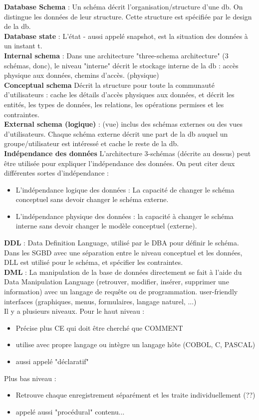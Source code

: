 \textbf{Database Schema} : 
Un schéma décrit l'organisation/structure d'une db. On distingue les données 
de leur structure. Cette structure est spécifiée par le design de la db.\\
\textbf{Database state} : L'état - aussi appelé snapshot, est la situation 
des données à un instant t. \\
\textbf{Internal schema} : 
Dans une architecture "three-schema architecture" (3 schémas, donc), 
le niveau "interne" décrit le stockage interne de la db : accès physique aux données, chemins d'accès. (physique)
\\
\textbf{Conceptual schema}
Décrit la structure pour toute la communauté d'utilisateurs : 
cache les détails d'accès physiques aux données, et décrit les entités, 
les types de données, les relations, les opérations permises et les contraintes.
\\
\textbf{External schema (logique)} :
(vue) inclus des schémas externes ou des vues d'utilisateurs. Chaque schéma externe décrit une part de la db auquel un groupe/utilisateur est intéressé et cache le reste de la db.\\
\textbf{Indépendance des données}
L'architecture 3-schémas (décrite au dessus) peut être utilisée pour expliquer l'indépendance des données. On peut citer deux différentes sortes d'indépendance :
\begin{itemize}
	\item L'indépendance logique des données : La capacité de changer le schéma conceptuel sans devoir changer le schéma externe.
	\item L'indépendance physique des données : la capacité à changer le schéma interne sans devoir changer le modèle conceptuel (externe). 
\end{itemize}

\textbf{DDL} :
Data Definition Language, utilisé par le DBA pour définir le schéma.
Dans les SGBD avec une séparation entre le niveau conceptuel et les données, 
DLL est utilisé pour le schéma, et spécifier les contraintes.\\
\textbf{DML} : 
La manipulation de la base de données directement se fait à l'aide du 
Data Manipulation Language (retrouver, modifier, insérer, supprimer une information) avec 
un langage de requête ou de programmation.
user-friendly interfaces (graphiques, menus, formulaires, langage naturel, ...)\\
Il y a plusieurs niveaux. Pour le haut niveau : 
\begin{itemize}
\item Précise plus CE qui doit être cherché que COMMENT
\item utilise avec propre langage ou intègre un langage hôte (COBOL, C, PASCAL)
\item aussi appelé "déclaratif"
\end{itemize}
Plus bas niveau :
\begin{itemize}
\item Retrouve chaque enregistrement séparément et les traite individuellement (??)
\item appelé aussi "procédural"
contenu...
\end{itemize}

